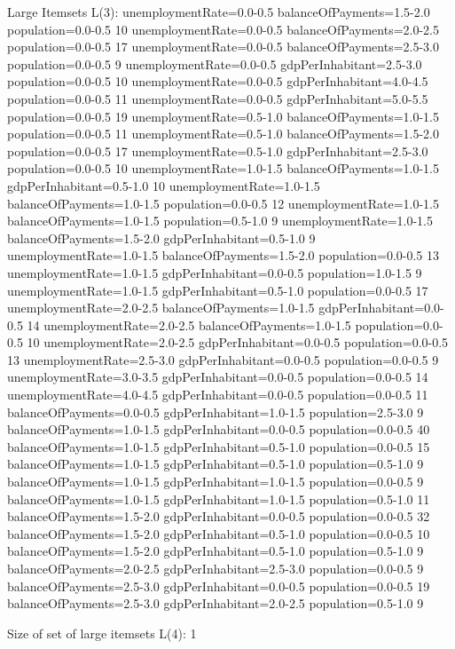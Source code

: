 Large Itemsets L(3):
unemploymentRate=0.0-0.5 balanceOfPayments=1.5-2.0 population=0.0-0.5 10
unemploymentRate=0.0-0.5 balanceOfPayments=2.0-2.5 population=0.0-0.5 17
unemploymentRate=0.0-0.5 balanceOfPayments=2.5-3.0 population=0.0-0.5 9
unemploymentRate=0.0-0.5 gdpPerInhabitant=2.5-3.0 population=0.0-0.5 10
unemploymentRate=0.0-0.5 gdpPerInhabitant=4.0-4.5 population=0.0-0.5 11
unemploymentRate=0.0-0.5 gdpPerInhabitant=5.0-5.5 population=0.0-0.5 19
unemploymentRate=0.5-1.0 balanceOfPayments=1.0-1.5 population=0.0-0.5 11
unemploymentRate=0.5-1.0 balanceOfPayments=1.5-2.0 population=0.0-0.5 17
unemploymentRate=0.5-1.0 gdpPerInhabitant=2.5-3.0 population=0.0-0.5 10
unemploymentRate=1.0-1.5 balanceOfPayments=1.0-1.5 gdpPerInhabitant=0.5-1.0 10
unemploymentRate=1.0-1.5 balanceOfPayments=1.0-1.5 population=0.0-0.5 12
unemploymentRate=1.0-1.5 balanceOfPayments=1.0-1.5 population=0.5-1.0 9
unemploymentRate=1.0-1.5 balanceOfPayments=1.5-2.0 gdpPerInhabitant=0.5-1.0 9
unemploymentRate=1.0-1.5 balanceOfPayments=1.5-2.0 population=0.0-0.5 13
unemploymentRate=1.0-1.5 gdpPerInhabitant=0.0-0.5 population=1.0-1.5 9
unemploymentRate=1.0-1.5 gdpPerInhabitant=0.5-1.0 population=0.0-0.5 17
unemploymentRate=2.0-2.5 balanceOfPayments=1.0-1.5 gdpPerInhabitant=0.0-0.5 14
unemploymentRate=2.0-2.5 balanceOfPayments=1.0-1.5 population=0.0-0.5 10
unemploymentRate=2.0-2.5 gdpPerInhabitant=0.0-0.5 population=0.0-0.5 13
unemploymentRate=2.5-3.0 gdpPerInhabitant=0.0-0.5 population=0.0-0.5 9
unemploymentRate=3.0-3.5 gdpPerInhabitant=0.0-0.5 population=0.0-0.5 14
unemploymentRate=4.0-4.5 gdpPerInhabitant=0.0-0.5 population=0.0-0.5 11
balanceOfPayments=0.0-0.5 gdpPerInhabitant=1.0-1.5 population=2.5-3.0 9
balanceOfPayments=1.0-1.5 gdpPerInhabitant=0.0-0.5 population=0.0-0.5 40
balanceOfPayments=1.0-1.5 gdpPerInhabitant=0.5-1.0 population=0.0-0.5 15
balanceOfPayments=1.0-1.5 gdpPerInhabitant=0.5-1.0 population=0.5-1.0 9
balanceOfPayments=1.0-1.5 gdpPerInhabitant=1.0-1.5 population=0.0-0.5 9
balanceOfPayments=1.0-1.5 gdpPerInhabitant=1.0-1.5 population=0.5-1.0 11
balanceOfPayments=1.5-2.0 gdpPerInhabitant=0.0-0.5 population=0.0-0.5 32
balanceOfPayments=1.5-2.0 gdpPerInhabitant=0.5-1.0 population=0.0-0.5 10
balanceOfPayments=1.5-2.0 gdpPerInhabitant=0.5-1.0 population=0.5-1.0 9
balanceOfPayments=2.0-2.5 gdpPerInhabitant=2.5-3.0 population=0.0-0.5 9
balanceOfPayments=2.5-3.0 gdpPerInhabitant=0.0-0.5 population=0.0-0.5 19
balanceOfPayments=2.5-3.0 gdpPerInhabitant=2.0-2.5 population=0.5-1.0 9

Size of set of large itemsets L(4): 1

